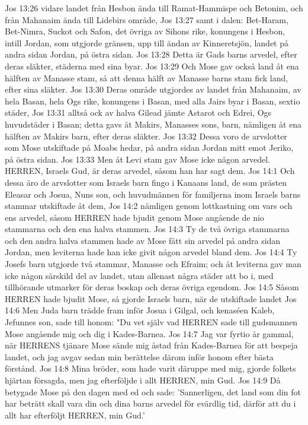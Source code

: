 Jos 13:26  vidare landet från Hesbon ända till Ramat-Hammispe och Betonim, och från Mahanaim ända till Lidebirs område,
Jos 13:27  samt i dalen: Bet-Haram, Bet-Nimra, Suckot och Safon, det övriga av Sihons rike, konungens i Hesbon, intill Jordan, som utgjorde gränsen, upp till ändan av Kinneretsjön, landet på andra sidan Jordan, på östra sidan.
Jos 13:28  Detta är Gads barns arvedel, efter deras släkter, städerna med sina byar.
Jos 13:29  Och Mose gav också land åt ena hälften av Manasse stam, så att denna hälft av Manasse barns stam fick land, efter sina släkter.
Jos 13:30  Deras område utgjordes av landet från Mahanaim, av hela Basan, hela Ogs rike, konungens i Basan, med alla Jairs byar i Basan, sextio städer,
Jos 13:31  alltså ock av halva Gilead jämte Astarot och Edrei, Ogs huvudstäder i Basan; detta gavs åt Makirs, Manasses sons, barn, nämligen åt ena hälften av Makirs barn, efter deras släkter.
Jos 13:32  Dessa voro de arvslotter som Mose utskiftade på Moabs hedar, på andra sidan Jordan mitt emot Jeriko, på östra sidan.
Jos 13:33  Men åt Levi stam gav Mose icke någon arvedel. HERREN, Israels Gud, är deras arvedel, såsom han har sagt dem.
Jos 14:1  Och dessa äro de arvslotter som Israels barn fingo i Kanaans land, de som prästen Eleasar och Josua, Nuns son, och huvudmännen för familjerna inom Israels barns stammar utskiftade åt dem,
Jos 14:2  nämligen genom lottkastning om vars och ens arvedel, såsom HERREN hade bjudit genom Mose angående de nio stammarna och den ena halva stammen.
Jos 14:3  Ty de två övriga stammarna och den andra halva stammen hade av Mose fått sin arvedel på andra sidan Jordan, men leviterna hade han icke givit någon arvedel bland dem.
Jos 14:4  Ty Josefs barn utgjorde två stammar, Manasse och Efraim; och åt leviterna gav man icke någon särskild del av landet, utan allenast några städer att bo i, med tillhörande utmarker för deras boskap och deras övriga egendom.
Jos 14:5  Såsom HERREN hade bjudit Mose, så gjorde Israels barn, när de utskiftade landet
Jos 14:6  Men Juda barn trädde fram inför Josua i Gilgal, och kenaséen Kaleb, Jefunnes son, sade till honom: "Du vet själv vad HERREN sade till gudsmannen Mose angående mig och dig i Kades-Barnea.
Jos 14:7  Jag var fyrtio år gammal, när HERRENS tjänare Mose sände mig åstad från Kades-Barnea för att bespeja landet, och jag avgav sedan min berättelse därom inför honom efter bästa förstånd.
Jos 14:8  Mina bröder, som hade varit däruppe med mig, gjorde folkets hjärtan försagda, men jag efterföljde i allt HERREN, min Gud.
Jos 14:9  Då betygade Mose på den dagen med ed och sade: 'Sannerligen, det land som din fot har beträtt skall vara din och dina barns arvedel för evärdlig tid, därför att du i allt har efterföljt HERREN, min Gud.'
